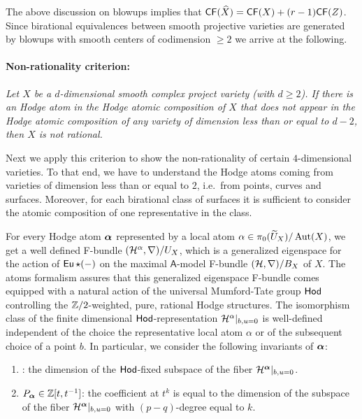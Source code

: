 \documentclass[twoside,leqno]{article}
\numberwithin{equation}{section}
\theoremstyle{plain}
\theoremstyle{definition}
\begin{document}
The above discussion on blowups implies that $\mathsf{CF}(\widehat{X}) = \mathsf{CF}(X) + (r-1) \mathsf{CF}(Z)$.
Since birational equivalences between smooth projective varieties are generated by blowups with smooth centers of codimension $\geq 2$ we arrive at the following.

\paragraph*{\bfseries Non-rationality criterion:}
    \emph{Let $X$ be a $d$-dimensional smooth complex project variety (with $d\ge 2$).
    If there is an Hodge atom in the Hodge atomic composition of $X$ that does not appear in the Hodge atomic composition of any variety of dimension less than or equal to $d-2$, then $X$ is not rational.}

\medskip

Next we apply this criterion to show the non-rationality of certain $4$-dimensional varieties.
To that end, we have to understand the Hodge atoms coming from varieties of dimension less than or equal to $2$, i.e.\ from points, curves and surfaces.
Moreover, for each birational class of surfaces it is sufficient to consider the atomic composition of one representative in the class.

For every Hodge atom $\boldsymbol{\alpha}$ represented by a local atom $\alpha \in \pi_{0}(\widetilde U_{X})/\operatorname{Aut}(X)$, we get a well defined F-bundle  $(\mathcal H^{\alpha},\nabla)/U_{X}$,  which is a generalized eigenspace for the action of $\operatorname{\mathsf{Eu}}\star (-)$ on the maximal $\mathsf{A}$-model F-bundle $(\mathcal H,\nabla)/B_{X}$ of $X$. The atoms formalism assures that this generalized eigenspace F-bundle comes equipped with a natural action of the universal Mumford-Tate group $\mathsf{Hod}$ controlling the $\mathbb Z/2$-weighted, pure, rational Hodge structures. The isomorphism class of the finite dimensional $\mathsf{Hod}$-representation $\mathcal H^{\alpha}|_{b,u=0}$ is well-defined independent of the choice the representative local atom $\alpha$ or of the subsequent choice of a point $b$.
In particular, we consider the following invariants of $\boldsymbol{\alpha}$:
\begin{enumerate}[wide]
\item {}: the dimension of the $\mathsf{Hod}$-fixed subspace of the fiber $\mathcal H^{\boldsymbol{\alpha}}|_{b,u=0}$.
\item {} $P_{\boldsymbol{\alpha}} \in \mathbb{Z}[t,t^{-1}]$: the coefficient at $t^k$ is equal to the dimension of the subspace of the fiber $\mathcal H^{\boldsymbol{\alpha}}|_{b,u=0}$ with $(p-q)$-degree equal to $k$.
\end{enumerate}
\end{document}
